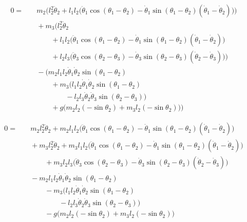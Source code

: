 \documentclass[11pt,a4paper]{article}
\begin{document}
\begin{align*}
  0 =&\quad m_2 \Big( l_2^2 \ddot{\theta}_2 + l_1 l_2 \big( \ddot{\theta}_1 \cos(\theta_1 - \theta_2) - \dot{\theta}_1 \sin(\theta_1 - \theta_2)(\dot{\theta}_1 - \dot{\theta}_2) \big) \Big) \\
    &\quad + m_3 \Big( l_2^2 \ddot{\theta}_2 \\
    &\qquad\quad + l_1 l_2 \big(\ddot{\theta}_1 \cos(\theta_1 - \theta_2) - \dot{\theta}_1 \sin(\theta_1 - \theta_2)(\dot{\theta}_1 - \dot{\theta}_2)\big) \\
    &\qquad\quad + l_2 l_3 \big(\ddot{\theta}_3 \cos(\theta_2 - \theta_3) - \dot{\theta}_3 \sin(\theta_2 - \theta_3)(\dot{\theta}_2 - \dot{\theta}_3) \big) \Big) \\
    &\quad- \Biggl(m_2 l_1 l_2 \dot{\theta}_1 \dot{\theta}_2 \sin(\theta_1 - \theta_2) \\
    &\qquad\quad+ m_3 \Big(l_1 l_2 \dot{\theta}_1 \dot{\theta}_2 \sin(\theta_1 - \theta_2) \\
    &\qquad\qquad\quad - l_2 l_3 \dot{\theta}_2 \dot{\theta}_3 \sin(\theta_2 - \theta_3) \Big) \\
    &\qquad\quad+ g \Big( m_2 l_2 (-\sin\theta_2) + m_3 l_2 (-\sin\theta_2) \Big) \Biggr)
\end{align*}

\begin{align*}
  0 =&\quad m_2 l_2^2 \ddot{\theta}_2 + m_2 l_1 l_2 \big( \ddot{\theta}_1 \cos(\theta_1 - \theta_2) - \dot{\theta}_1 \sin(\theta_1 - \theta_2)(\dot{\theta}_1 - \dot{\theta}_2) \big) \\
    &\quad + m_3 l_2^2 \ddot{\theta}_2 + m_3 l_1 l_2 \big(\ddot{\theta}_1 \cos(\theta_1 - \theta_2) - \dot{\theta}_1 \sin(\theta_1 - \theta_2)(\dot{\theta}_1 - \dot{\theta}_2)\big) \\
    &\qquad\quad + m_3 l_2 l_3 \big(\ddot{\theta}_3 \cos(\theta_2 - \theta_3) - \dot{\theta}_3 \sin(\theta_2 - \theta_3)(\dot{\theta}_2 - \dot{\theta}_3) \big) \\
    &\quad- m_2 l_1 l_2 \dot{\theta}_1 \dot{\theta}_2 \sin(\theta_1 - \theta_2) \\
    &\qquad\quad - m_3 \Big(l_1 l_2 \dot{\theta}_1 \dot{\theta}_2 \sin(\theta_1 - \theta_2) \\
    &\qquad\qquad\quad - l_2 l_3 \dot{\theta}_2 \dot{\theta}_3 \sin(\theta_2 - \theta_3) \Big) \\
    &\qquad\quad - g \Big( m_2 l_2 (-\sin\theta_2) + m_3 l_2 (-\sin\theta_2) \Big)
\end{align*}
\end{document}

